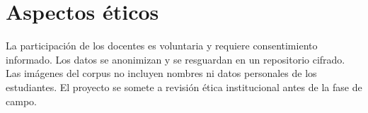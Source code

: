 \section{Aspectos éticos}

La participación de los docentes es voluntaria y requiere consentimiento
informado. Los datos se anonimizan y se resguardan en un repositorio cifrado. Las
imágenes del corpus no incluyen nombres ni datos personales de los estudiantes.
El proyecto se somete a revisión ética institucional antes de la fase de campo.
